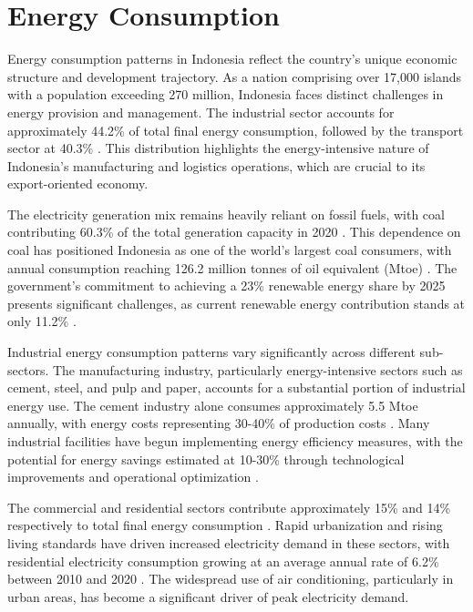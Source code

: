 \section{Energy Consumption}

Energy consumption patterns in Indonesia reflect the country's unique economic structure and development trajectory. As a nation comprising over 17,000 islands with a population exceeding 270 million, Indonesia faces distinct challenges in energy provision and management. The industrial sector accounts for approximately 44.2\% of total final energy consumption, followed by the transport sector at 40.3\% \cite{IEA2021}. This distribution highlights the energy-intensive nature of Indonesia's manufacturing and logistics operations, which are crucial to its export-oriented economy.

The electricity generation mix remains heavily reliant on fossil fuels, with coal contributing 60.3\% of the total generation capacity in 2020 \cite{PLN2021}. This dependence on coal has positioned Indonesia as one of the world's largest coal consumers, with annual consumption reaching 126.2 million tonnes of oil equivalent (Mtoe) \cite{BP2021}. The government's commitment to achieving a 23\% renewable energy share by 2025 presents significant challenges, as current renewable energy contribution stands at only 11.2\% \cite{MEMR2021}.

Industrial energy consumption patterns vary significantly across different sub-sectors. The manufacturing industry, particularly energy-intensive sectors such as cement, steel, and pulp and paper, accounts for a substantial portion of industrial energy use. The cement industry alone consumes approximately 5.5 Mtoe annually, with energy costs representing 30-40\% of production costs \cite{CementAssociation2020}. Many industrial facilities have begun implementing energy efficiency measures, with the potential for energy savings estimated at 10-30\% through technological improvements and operational optimization \cite{ESDM2019}.

The commercial and residential sectors contribute approximately 15\% and 14\% respectively to total final energy consumption \cite{IEA2021}. Rapid urbanization and rising living standards have driven increased electricity demand in these sectors, with residential electricity consumption growing at an average annual rate of 6.2\% between 2010 and 2020 \cite{PLN2021}. The widespread use of air conditioning, particularly in urban areas, has become a significant driver of peak electricity demand.

